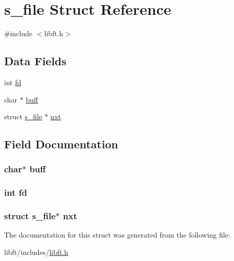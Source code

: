 \hypertarget{structs__file}{}\section{s\+\_\+file Struct Reference}
\label{structs__file}


{\ttfamily \#include $<$libft.\+h$>$}

\subsection*{Data Fields}
\begin{DoxyCompactItemize}
\item 
int \hyperlink{structs__file_a6f8059414f0228f0256115e024eeed4b}{fd}
\item 
char $\ast$ \hyperlink{structs__file_a13d46a89176726a5343cab02f94ebc9e}{buff}
\item 
struct \hyperlink{structs__file}{s\+\_\+file} $\ast$ \hyperlink{structs__file_a2a94b7ec825bfc592c7005d1cf420d62}{nxt}
\end{DoxyCompactItemize}


\subsection{Field Documentation}
\subsubsection[{\texorpdfstring{buff}{buff}}]{\setlength{\rightskip}{0pt plus 5cm}char$\ast$ buff}\hypertarget{structs__file_a13d46a89176726a5343cab02f94ebc9e}{}\label{structs__file_a13d46a89176726a5343cab02f94ebc9e}
\subsubsection[{\texorpdfstring{fd}{fd}}]{\setlength{\rightskip}{0pt plus 5cm}int fd}\hypertarget{structs__file_a6f8059414f0228f0256115e024eeed4b}{}\label{structs__file_a6f8059414f0228f0256115e024eeed4b}
\subsubsection[{\texorpdfstring{nxt}{nxt}}]{\setlength{\rightskip}{0pt plus 5cm}struct {\bf s\+\_\+file}$\ast$ nxt}\hypertarget{structs__file_a2a94b7ec825bfc592c7005d1cf420d62}{}\label{structs__file_a2a94b7ec825bfc592c7005d1cf420d62}


The documentation for this struct was generated from the following file\+:\begin{DoxyCompactItemize}
\item 
libft/includes/\hyperlink{libft_8h}{libft.\+h}\end{DoxyCompactItemize}
